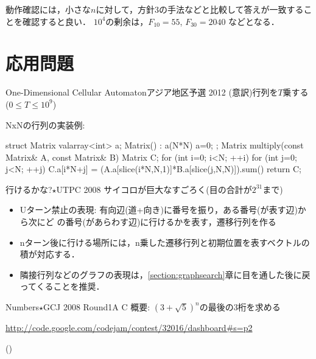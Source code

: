 動作確認には，小さな$n$に対して，方針3の手法などと比較して答えが一致することを確認すると良い．
$10^4$の剰余は，$F_{10} = 55$, $F_{30} = 2040$ などとなる．


\section{応用問題}

\begin{pbox}{One-Dimensional Cellular Automaton}{アジア地区予選 2012}
(意訳)行列を$T$乗する  ($0\le T \le 10^9$) 

\end{pbox}

NxNの行列の実装例:
\begin{cbox}
struct Matrix {
    valarray<int> a;
    Matrix() : a(N*N) { a=0; }
};
Matrix multiply(const Matrix& A, const Matrix& B) {
    Matrix C;
    for (int i=0; i<N; ++i)
        for (int j=0; j<N; ++j)
            C.a[i*N+j] = (A.a[slice(i*N,N,1)]*B.a[slice(j,N,N)]).sum()
    return C;
}
\end{cbox}


\begin{pbox}{行けるかな?$\star$}{UTPC 2008}
   サイコロが巨大なすごろく(目の合計が$2^{31}$まで)

\end{pbox}

\begin{itemize}
\setlength{\itemsep}{0pt}
\item Uターン禁止の表現: 有向辺(道+向き)に番号を振り，ある番号(が表す辺)から次にど
  の番号(があらわす辺)に行けるかを表す，遷移行列を作る
\item nターン後に行ける場所には，n乗した遷移行列と初期位置を表すベクトルの積が対応する．
\item 隣接行列などのグラフの表現は，\ref{section:graphsearch}章に目を通した後に戻ってくることを推奨．
\end{itemize}

\begin{pbox}{Numbers$\star$}{GCJ 2008 Round1A C}
概要: $(3+\sqrt{5})^n$の最後の3桁を求める

\url{http://code.google.com/codejam/contest/32016/dashboard#s=p2}
\end{pbox}

(\pccbook[p.~239])

